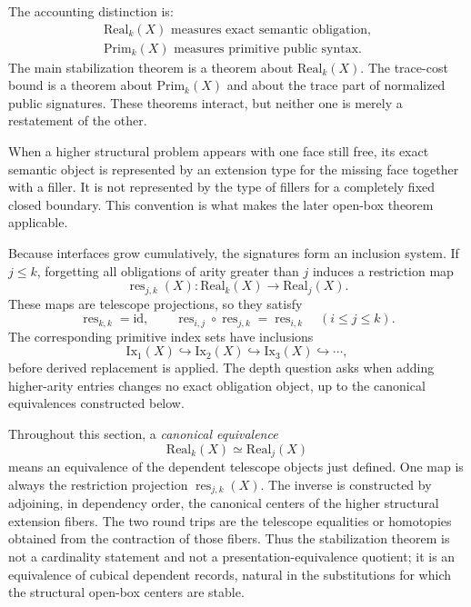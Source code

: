 \documentclass{lmcs}
\newcommand{\res}{\operatorname{res}}
\begin{document}
The accounting distinction is:
\[
  \begin{gathered}
  \mathrm{Real}_k(X) \text{ measures exact semantic obligation,}\\
  \mathrm{Prim}_k(X) \text{ measures primitive public syntax.}
  \end{gathered}
\]
The main stabilization theorem is a theorem about \(\mathrm{Real}_k(X)\).  The trace-cost
bound is a theorem about \(\mathrm{Prim}_k(X)\) and about the trace part of normalized public
signatures.  These theorems interact, but neither one is merely a restatement of the other.

When a higher structural problem appears with one face still free, its exact semantic object
is represented by an extension type for the missing face together with a filler.  It is not
represented by the type of fillers for a completely fixed closed boundary.  This convention is
what makes the later open-box theorem applicable.

Because interfaces grow cumulatively, the signatures form an inclusion system.  If \(j\leq k\),
forgetting all obligations of arity greater than \(j\) induces a restriction map
\[
  \res_{j,k}(X):\mathrm{Real}_k(X)\longrightarrow \mathrm{Real}_j(X).
\]
These maps are telescope projections, so they satisfy
\[
  \res_{k,k}=\mathrm{id},
  \qquad
  \res_{i,j}\circ\res_{j,k}=\res_{i,k}
  \quad (i\leq j\leq k).
\]
The corresponding primitive index sets have inclusions
\[
  \mathrm{Ix}_1(X)\hookrightarrow \mathrm{Ix}_2(X)\hookrightarrow
  \mathrm{Ix}_3(X)\hookrightarrow\cdots,
\]
before derived replacement is applied.  The depth question asks when adding higher-arity
entries changes no exact obligation object, up to the canonical equivalences constructed
below.

Throughout this section, a \emph{canonical equivalence}
\[
  \mathrm{Real}_k(X)\simeq \mathrm{Real}_j(X)
\]
means an equivalence of the dependent telescope objects just defined.  One map is always the
restriction projection \(\res_{j,k}(X)\).  The inverse is constructed by adjoining, in
dependency order, the canonical centers of the higher structural extension fibers.  The two
round trips are the telescope equalities or homotopies obtained from the contraction of those
fibers.  Thus the stabilization theorem is not a cardinality statement and not a
presentation-equivalence quotient; it is an equivalence of cubical dependent records, natural
in the substitutions for which the structural open-box centers are stable.
\end{document}
